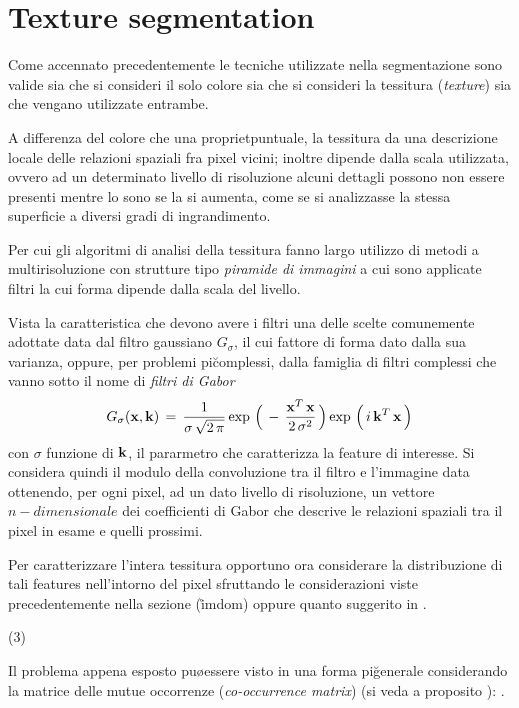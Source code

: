 \section{Texture segmentation}

Come accennato precedentemente le tecniche utilizzate nella segmentazione sono valide
sia che si consideri il solo colore sia che si consideri la tessitura ({\it texture})
sia che vengano utilizzate entrambe.

A differenza del colore che \e una propriet\a puntuale, la tessitura da una descrizione
locale delle relazioni spaziali fra pixel vicini; inoltre dipende dalla scala 
utilizzata, ovvero ad un determinato livello di risoluzione alcuni dettagli possono non
essere presenti mentre lo sono se la si aumenta, come se si analizzasse la stessa superficie 
a diversi gradi di ingrandimento.

Per cui gli algoritmi di analisi della tessitura fanno largo utilizzo di metodi
a multirisoluzione con strutture tipo {\it piramide di immagini} a cui sono applicate
filtri la cui forma dipende dalla scala del livello.

Vista la caratteristica che devono avere i filtri una delle scelte comunemente adottate
\e data dal filtro gaussiano $G_\sigma$, il cui fattore di forma \e dato dalla sua varianza,
oppure, per problemi pi\u complessi, dalla famiglia di filtri complessi che vanno sotto
il nome di {\it filtri di Gabor}
$$
G_\sigma({\bf x},{\bf k})\,=\,\frac{1}{\sigma\,\sqrt{2\,\pi}}
                           \exp\,\Big(\,-\,\frac{{\bf x}^T\,{\bf x}}{2\,\sigma^2}\,\Big)
                           \exp\,\Big(\,{\mit i}\,{\bf k}^T\,{\bf x}\,\Big)
$$
con $\sigma$ funzione di ${\bf k}$, il pararmetro che caratterizza la feature di interesse.
Si considera quindi il modulo della convoluzione tra il filtro e l'immagine data
ottenendo, per ogni pixel, ad un dato livello di risoluzione, un vettore $n-dimensionale$
dei coefficienti di Gabor che descrive le relazioni spaziali tra il pixel in esame e quelli prossimi.

Per caratterizzare l'intera tessitura \e opportuno ora considerare la distribuzione di tali
features nell'intorno del pixel sfruttando le considerazioni viste precedentemente nella
sezione (\r{imdom}) oppure quanto suggerito in \cite{Puzicha}.

\vs (3)

Il problema appena esposto pu\o essere visto in una forma pi\u generale considerando la 
matrice delle mutue occorrenze ({\it co-occurrence matrix}) (si veda a proposito 
\cite{Haralick92}):
.

